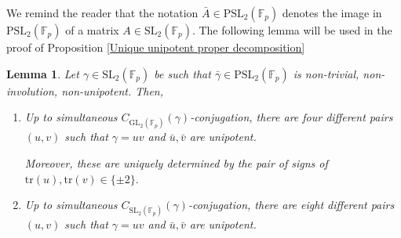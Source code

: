 \documentclass[letterpaper]{amsart}
\newtheorem{lemma}[theorem]{Lemma}
\begin{document}
We remind the reader that the notation $\bar{A} \in \mathrm{PSL}_2(\mathbb{F}_p)$ denotes the image in $\mathrm{PSL}_2(\mathbb{F}_p)$ of a matrix $A \in \mathrm{SL}_2(\mathbb{F}_p)$.
The following lemma will be used in the proof of Proposition \ref{Unique unipotent proper decomposition}
\begin{lemma}
\label{four_eight_decompositions}
Let $\gamma \in \mathrm{SL}_2(\mathbb{F}_p)$ be such that $\bar{\gamma} \in \mathrm{PSL}_2(\mathbb{F}_p)$ is non-trivial, non-involution, non-unipotent. Then,
\begin{enumerate}
    \item Up to simultaneous $C_{\mathrm{GL}_2(\mathbb{F}_p)}(\gamma)$-conjugation, there are four different pairs $(u, v)$ such that $\gamma = uv$ and $\bar{u},\bar{v}$ are unipotent. 
    
    Moreover, these are uniquely determined by the pair of signs of $\mathrm{tr}(u),\mathrm{tr}(v) \in \{\pm 2\}.$
    \item Up to simultaneous $C_{\mathrm{SL}_2(\mathbb{F}_p)}(\gamma)$-conjugation, there are eight different pairs $(u, v)$ such that $\gamma = uv$ and $\bar{u},\bar{v}$ are unipotent.
\end{enumerate} 
\end{lemma}
\end{document}
